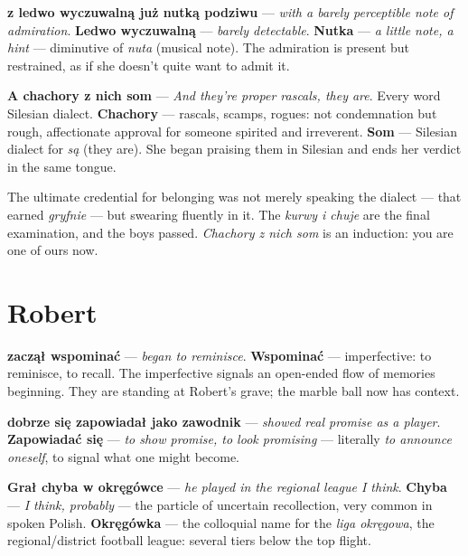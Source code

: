 \textbf{z ledwo wyczuwalną już nutką podziwu} --- \textit{with a barely
perceptible note of admiration}. \textbf{Ledwo wyczuwalną} ---
\textit{barely detectable}. \textbf{Nutka} --- \textit{a little note,
a hint} --- diminutive of \textit{nuta} (musical note). The admiration
is present but restrained, as if she doesn't quite want to admit it.

\textbf{A chachory z nich som} --- \textit{And they're proper rascals,
they are}. Every word Silesian dialect. \textbf{Chachory} --- rascals,
scamps, rogues: not condemnation but rough, affectionate approval for
someone spirited and irreverent. \textbf{Som} --- Silesian dialect for
\textit{są} (they are). She began praising them in Silesian and ends
her verdict in the same tongue.

The ultimate credential for belonging was not merely speaking the
dialect --- that earned \textit{gryfnie} --- but swearing fluently in
it. The \textit{kurwy i chuje} are the final examination, and the boys
passed. \textit{Chachory z nich som} is an induction: you are one of
ours now.

\section{Robert}


\textbf{zaczął wspominać} --- \textit{began to reminisce}.
\textbf{Wspominać} --- imperfective: to reminisce, to recall. The
imperfective signals an open-ended flow of memories beginning. They
are standing at Robert's grave; the marble ball now has context.

\textbf{dobrze się zapowiadał jako zawodnik} --- \textit{showed real
promise as a player}. \textbf{Zapowiadać się} --- \textit{to show
promise, to look promising} --- literally \textit{to announce oneself},
to signal what one might become.

\textbf{Grał chyba w okręgówce} --- \textit{he played in the regional
league I think}. \textbf{Chyba} --- \textit{I think, probably} ---
the particle of uncertain recollection, very common in spoken Polish.
\textbf{Okręgówka} --- the colloquial name for the \textit{liga
okręgowa}, the regional/district football league: several tiers below
the top flight.

